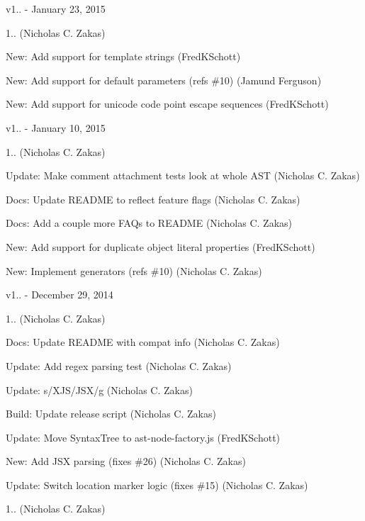 v1.. -\/ January 23, 2015


\begin{DoxyItemize}
\item 1.. (Nicholas C. Zakas)
\item New\+: Add support for template strings (Fred\+K\+Schott)
\item New\+: Add support for default parameters (refs \#10) (Jamund Ferguson)
\item New\+: Add support for unicode code point escape sequences (Fred\+K\+Schott)
\end{DoxyItemize}

v1.. -\/ January 10, 2015


\begin{DoxyItemize}
\item 1.. (Nicholas C. Zakas)
\item Update\+: Make comment attachment tests look at whole A\+ST (Nicholas C. Zakas)
\item Docs\+: Update R\+E\+A\+D\+ME to reflect feature flags (Nicholas C. Zakas)
\item Docs\+: Add a couple more F\+A\+Qs to R\+E\+A\+D\+ME (Nicholas C. Zakas)
\item New\+: Add support for duplicate object literal properties (Fred\+K\+Schott)
\item New\+: Implement generators (refs \#10) (Nicholas C. Zakas)
\end{DoxyItemize}

v1.. -\/ December 29, 2014


\begin{DoxyItemize}
\item 1.. (Nicholas C. Zakas)
\item Docs\+: Update R\+E\+A\+D\+ME with compat info (Nicholas C. Zakas)
\item Update\+: Add regex parsing test (Nicholas C. Zakas)
\item Update\+: s/\+X\+J\+S/\+J\+S\+X/g (Nicholas C. Zakas)
\item Build\+: Update release script (Nicholas C. Zakas)
\item Update\+: Move Syntax\+Tree to ast-\/node-\/factory.\+js (Fred\+K\+Schott)
\item New\+: Add J\+SX parsing (fixes \#26) (Nicholas C. Zakas)
\item Update\+: Switch location marker logic (fixes \#15) (Nicholas C. Zakas)
\item 1.. (Nicholas C. Zakas)
\end{DoxyItemize}

